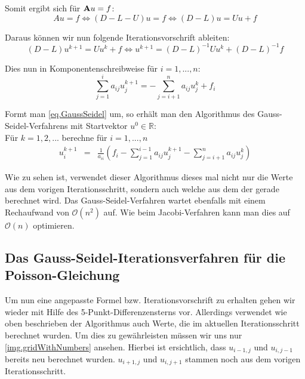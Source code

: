 Somit ergibt sich für ${\textbf{A}}u = f$:
\begin{equation}
Au = f \Leftrightarrow (D-L-U)u = f \Leftrightarrow (D-L)u = Uu + f
\end{equation}

Daraus können wir nun folgende Iterationsvorschrift ableiten:
\begin{equation}
(D-L)u^{k+1} = Uu^{k} + f \Leftrightarrow u^{k+1} = (D-L)^{-1}Uu^{k} + (D-L)^{-1}f
\end{equation}

Dies nun in Komponentenschreibweise für $i=1,...,n$:
\begin{equation}
\sum\limits_{j=1}^{i} a_{ij}u_{j}^{k+1} = -\sum\limits_{j=i+1}^{n} a_{ij}u_{j}^{k} + f_{i}\label{eq.GaussSeidel}
\end{equation}

Formt man \autoref{eq.GaussSeidel} um, so erhält man den Algorithmus des Gauss-Seidel-Verfahrens mit Startvektor $u^{0} \in \mathbb{R}$: \\

Für $k = 1,2,...$ berechne für $i = 1,...,n$
\begin{eqnarray}
u_{i}^{k+1} &=& \frac {1} {a_{ii}} (f_{i} - \sum\limits_{j=1}^{i-1} a_{ij}u_{j}^{k+1} - \sum\limits_{j=i+1}^{n} a_{ij}u_{j}^{k})
\end{eqnarray}

Wie zu sehen ist, verwendet dieser Algorithmus dieses mal nicht nur die Werte aus dem vorigen Iterationsschritt, sondern auch welche aus dem der gerade berechnet wird. Das Gauss-Seidel-Verfahren wartet ebenfalls mit einem Rechaufwand von $\mathcal{O}(n^{2})$ auf. Wie beim Jacobi-Verfahren kann man dies auf $\mathcal{O}(n)$ optimieren.

\subsection{Das Gauss-Seidel-Iterationsverfahren für die Poisson-Gleichung}\label{ss.Gauss-Seidel-Verfahren der Poisson Gleichung}

Um nun eine angepasste Formel bzw. Iterationsvorschrift zu erhalten gehen wir wieder mit Hilfe des 5-Punkt-Differenzensterns vor. Allerdings verwendet wie oben beschrieben der Algorithmus auch Werte, die im aktuellen Iterationsschritt berechnet wurden. Um dies zu gewährleisten müssen wir uns nur \autoref{img.gridWithNumbers} ansehen. Hierbei ist ersichtlich, dass $u_{i-1,j}$ und $u_{i,j-1}$ bereits neu berechnet wurden. $u_{i+1,j}$ und $u_{i,j+1}$ stammen noch aus dem vorigen Iterationsschritt.


